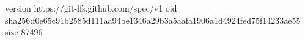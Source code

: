 version https://git-lfs.github.com/spec/v1
oid sha256:f0e65c91b2585d111aa94be1346a29b3a5aafa1906a1d4924fed75f14233ae55
size 87496
